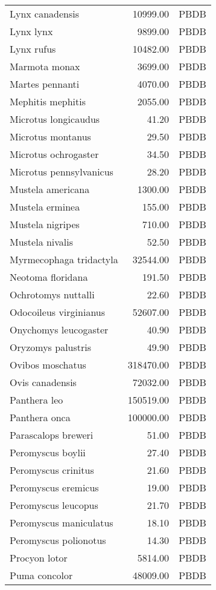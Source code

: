 \begin{table}[ht]
\begin{tabular}{lrl}
  Lynx canadensis & 10999.00 & PBDB \\ 
  Lynx lynx & 9899.00 & PBDB \\ 
  Lynx rufus & 10482.00 & PBDB \\ 
  Marmota monax & 3699.00 & PBDB \\ 
  Martes pennanti & 4070.00 & PBDB \\ 
  Mephitis mephitis & 2055.00 & PBDB \\ 
  Microtus longicaudus & 41.20 & PBDB \\ 
  Microtus montanus & 29.50 & PBDB \\ 
  Microtus ochrogaster & 34.50 & PBDB \\ 
  Microtus pennsylvanicus & 28.20 & PBDB \\ 
  Mustela americana & 1300.00 & PBDB \\ 
  Mustela erminea & 155.00 & PBDB \\ 
  Mustela nigripes & 710.00 & PBDB \\ 
  Mustela nivalis & 52.50 & PBDB \\ 
  Myrmecophaga tridactyla & 32544.00 & PBDB \\ 
  Neotoma floridana & 191.50 & PBDB \\ 
  Ochrotomys nuttalli & 22.60 & PBDB \\ 
  Odocoileus virginianus & 52607.00 & PBDB \\ 
  Onychomys leucogaster & 40.90 & PBDB \\ 
  Oryzomys palustris & 49.90 & PBDB \\ 
  Ovibos moschatus & 318470.00 & PBDB \\ 
  Ovis canadensis & 72032.00 & PBDB \\ 
  Panthera leo & 150519.00 & PBDB \\ 
  Panthera onca & 100000.00 & PBDB \\ 
  Parascalops breweri & 51.00 & PBDB \\ 
  Peromyscus boylii & 27.40 & PBDB \\ 
  Peromyscus crinitus & 21.60 & PBDB \\ 
  Peromyscus eremicus & 19.00 & PBDB \\ 
  Peromyscus leucopus & 21.70 & PBDB \\ 
  Peromyscus maniculatus & 18.10 & PBDB \\ 
  Peromyscus polionotus & 14.30 & PBDB \\ 
  Procyon lotor & 5814.00 & PBDB \\ 
  Puma concolor & 48009.00 & PBDB \\ 

\end{tabular}
\end{table}
